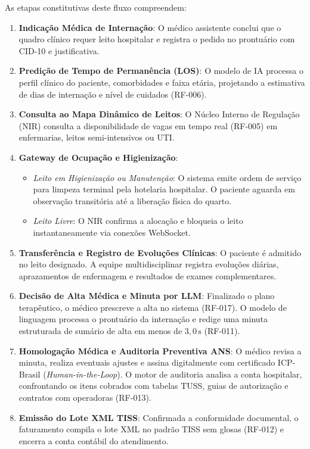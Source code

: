 As etapas constitutivas deste fluxo compreendem:
\begin{enumerate}[leftmargin=*]
    \item \textbf{Indicação Médica de Internação}: O médico assistente conclui que o quadro clínico requer leito hospitalar e registra o pedido no prontuário com CID-10 e justificativa.
    \item \textbf{Predição de Tempo de Permanência (LOS)}: O modelo de IA processa o perfil clínico do paciente, comorbidades e faixa etária, projetando a estimativa de dias de internação e nível de cuidados (RF-006).
    \item \textbf{Consulta ao Mapa Dinâmico de Leitos}: O Núcleo Interno de Regulação (NIR) consulta a disponibilidade de vagas em tempo real (RF-005) em enfermarias, leitos semi-intensivos ou UTI.
    \item \textbf{Gateway de Ocupação e Higienização}:
    \begin{itemize}
        \item \textit{Leito em Higienização ou Manutenção}: O sistema emite ordem de serviço para limpeza terminal pela hotelaria hospitalar. O paciente aguarda em observação transitória até a liberação física do quarto.
        \item \textit{Leito Livre}: O NIR confirma a alocação e bloqueia o leito instantaneamente via conexões WebSocket.
    \end{itemize}
    \item \textbf{Transferência e Registro de Evoluções Clínicas}: O paciente é admitido no leito designado. A equipe multidisciplinar registra evoluções diárias, aprazamentos de enfermagem e resultados de exames complementares.
    \item \textbf{Decisão de Alta Médica e Minuta por LLM}: Finalizado o plano terapêutico, o médico prescreve a alta no sistema (RF-017). O modelo de linguagem processa o prontuário da internação e redige uma minuta estruturada de sumário de alta em menos de $3{,}0\,\text{s}$ (RF-011).
    \item \textbf{Homologação Médica e Auditoria Preventiva ANS}: O médico revisa a minuta, realiza eventuais ajustes e assina digitalmente com certificado ICP-Brasil (\textit{Human-in-the-Loop}). O motor de auditoria analisa a conta hospitalar, confrontando os itens cobrados com tabelas TUSS, guias de autorização e contratos com operadoras (RF-013).
    \item \textbf{Emissão do Lote XML TISS}: Confirmada a conformidade documental, o faturamento compila o lote XML no padrão TISS sem glosas (RF-012) e encerra a conta contábil do atendimento.
\end{enumerate}

